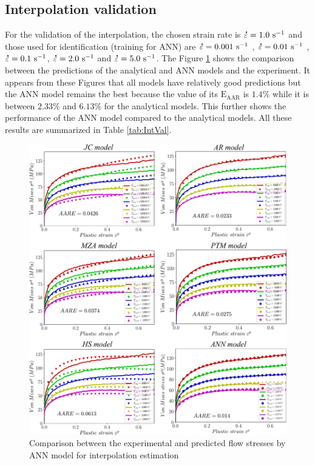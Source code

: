 \documentclass[twoside,english,1p,final,sort&compress]{elsarticle}
\theoremstyle{plain}
\newcommand{\mdot}[1]{\accentset{\mbox{\bfseries .}}{#1}}
\newcommand{\AARE}{\text{E}_\text{AAR}}
\newcommand{\ps}{\text{s}^{-1}}
\begin{document}
\subsection{Interpolation validation}
For the validation of the interpolation, the chosen strain rate is $\mdot\varepsilon = 1.0\ \ps$ and those used for identification (training for ANN) are $\mdot\varepsilon = 0.001\ \ps$ , $\mdot\varepsilon = 0.01\ \ps$ , $\mdot\varepsilon = 0.1\ \ps$, $\mdot\varepsilon = 2.0\ \ps$  and $\mdot\varepsilon = 5.0\ \ps$.
The Figure \ref{fig:IntComp} shows the comparison between the predictions of the analytical and ANN models and the experiment.
It appears from these Figures that all models have relatively good predictions but the ANN model remains the best because the value of its $\AARE$ is $1.4\%$ while it is between $2.33\%$ and $6.13\%$ for the analytical models.
This further shows the performance of the ANN model compared to the analytical models.
All these results are summarized in Table \ref{tab:IntVal}.
\begin{figure}[!ht]
\centering
\includegraphics[width=1.02\columnwidth]
{Figures/inCombinaison}
\caption{Comparison between the experimental and predicted flow stresses by ANN model for interpolation estimation}
\label{fig:IntComp}
\end{figure}
\end{document}

